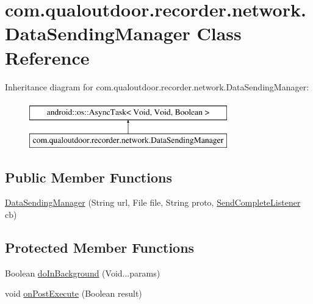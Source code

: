 \hypertarget{classcom_1_1qualoutdoor_1_1recorder_1_1network_1_1DataSendingManager}{\section{com.\-qualoutdoor.\-recorder.\-network.\-Data\-Sending\-Manager Class Reference}
\label{classcom_1_1qualoutdoor_1_1recorder_1_1network_1_1DataSendingManager}
}
Inheritance diagram for com.\-qualoutdoor.\-recorder.\-network.\-Data\-Sending\-Manager\-:\begin{figure}[H]
\begin{center}
\leavevmode
\includegraphics[height=2.000000cm]{classcom_1_1qualoutdoor_1_1recorder_1_1network_1_1DataSendingManager}
\end{center}
\end{figure}
\subsection*{Public Member Functions}
\begin{DoxyCompactItemize}
\item 
\hyperlink{classcom_1_1qualoutdoor_1_1recorder_1_1network_1_1DataSendingManager_aa2daaa4cb7108f6eed82d2e16da24cf3}{Data\-Sending\-Manager} (String url, File file, String proto, \hyperlink{interfacecom_1_1qualoutdoor_1_1recorder_1_1network_1_1SendCompleteListener}{Send\-Complete\-Listener} cb)
\end{DoxyCompactItemize}
\subsection*{Protected Member Functions}
\begin{DoxyCompactItemize}
\item 
Boolean \hyperlink{classcom_1_1qualoutdoor_1_1recorder_1_1network_1_1DataSendingManager_a3c641c980b8e9f2da6034ac440002d90}{do\-In\-Background} (Void...\-params)
\item 
void \hyperlink{classcom_1_1qualoutdoor_1_1recorder_1_1network_1_1DataSendingManager_a7babe778e41aeb1b91cb94943594e4a4}{on\-Post\-Execute} (Boolean result)
\end{DoxyCompactItemize}
